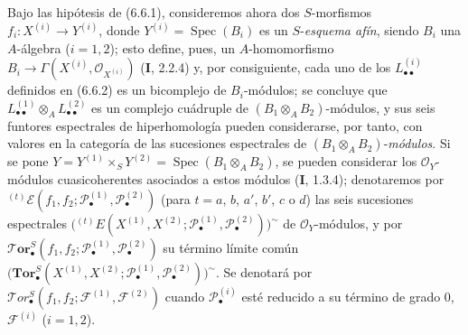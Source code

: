 \begin{env}[6.6.8]
\label{III.6.6.8}
Bajo las hipótesis de (6.6.1), consideremos ahora dos $S$-morfismos
$f_i:X^{(i)}\to Y^{(i)}$, donde
$Y^{(i)}=\operatorname{Spec}(B_i)$ es un $S$-\emph{esquema afín}, siendo
$B_i$ una $A$-álgebra ($i=1,2$); esto define, pues, un $A$-homomorfismo
$B_i\to\Gamma(X^{(i)},\mathscr O_{X^{(i)}})$ (\textbf I, 2.2.4) y, por consiguiente,
cada uno de los $L_{\bullet\bullet}^{(i)}$ definidos en (6.6.2) es un
bicomplejo de $B_i$-módulos; se concluye que
$L_{\bullet\bullet}^{(1)}\otimes_A L_{\bullet\bullet}^{(2)}$ es un
complejo cuádruple de $(B_1\otimes_A B_2)$-módulos, y sus seis funtores
espectrales de hiperhomología pueden considerarse, por tanto, con valores en
la categoría de las sucesiones espectrales de
$(B_1\otimes_A B_2)$-\emph{módulos}. Si se pone
$Y=Y^{(1)}\times_S Y^{(2)}=\operatorname{Spec}(B_1\otimes_A B_2)$, se pueden
considerar los $\mathscr O_Y$-módulos cuasicoherentes asociados a estos
módulos (\textbf I, 1.3.4); denotaremos por
${}^{(t)}\mathscr E
(f_1,f_2;\mathscr P_\bullet^{(1)},\mathscr P_\bullet^{(2)})$
(para $t=a$, $b$, $a'$, $b'$, $c$ o $d$) las seis sucesiones espectrales
$
  \bigl({}^{(t)}E
  (X^{(1)},X^{(2)};
   \mathscr P_\bullet^{(1)},\mathscr P_\bullet^{(2)})\bigr)^{\sim}$
de $\mathscr O_Y$-módulos, y por
$\boldsymbol{\mathscr{T}\!or}_\bullet^S
(f_1,f_2;\mathscr P_\bullet^{(1)},\mathscr P_\bullet^{(2)})$ su término
límite común
$
  \bigl(\mathbf{Tor}_\bullet^S
  (X^{(1)},X^{(2)};
   \mathscr P_\bullet^{(1)},\mathscr P_\bullet^{(2)})\bigr)^{\sim}$. Se denotará por $\mathscr{T}\!or_\bullet^S(f_1,f_2;\mathscr F^{(1)},\mathscr F^{(2)})$
cuando $\mathscr P_\bullet^{(i)}$ esté reducido a su término de grado 0,
$\mathscr F^{(i)}$ ($i=1,2$).
\end{env}
